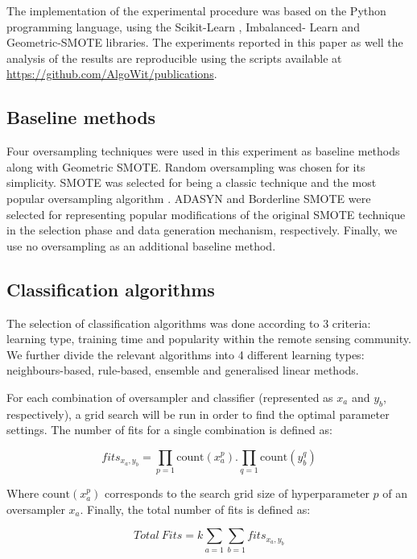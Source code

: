 \documentclass[parskip=full]{scrartcl}
\begin{document}
The implementation of the experimental procedure was based on the Python
programming language, using the Scikit-Learn \cite{Pedregosa2011}, Imbalanced-
Learn \cite{JMLR:v18:16-365} and Geometric-SMOTE \cite{Douzas2019} libraries.
The experiments reported in this paper as well the analysis of the results are
reproducible using the scripts available at \url{https://github.com/AlgoWit/publications}.

\subsection{Baseline methods}

Four oversampling techniques were used in this experiment as baseline methods
along with Geometric SMOTE. Random oversampling was chosen for its simplicity.
SMOTE was selected for being a classic technique and the most popular
oversampling algorithm \cite{Douzas2019}. ADASYN \cite{HaiboHe2008} and
Borderline SMOTE \cite{Han2005} were selected for representing popular
modifications of the original SMOTE technique in the selection phase and data
generation mechanism, respectively. Finally, we use no oversampling as an
additional baseline method.

\subsection{Classification algorithms}

The selection of classification algorithms was done according to 3 criteria:
learning type, training time and popularity within the remote sensing
community. We further divide the relevant algorithms into 4 different learning
types: neighbours-based, rule-based, ensemble and generalised linear methods.

For each combination of oversampler and classifier (represented as $x_a$ and
$y_b$, respectively), a grid search will be run in order to find the optimal
parameter settings. The number of fits for a single combination  is defined as:

\[
fits_{x_a,y_b}=\prod\limits_{p=1} \textrm{count}(x_a^p).\prod\limits_{q=1}
\textrm{count}(y_b^q)
\]

Where $\textrm{count}(x_a^p)$ corresponds to the search grid size of
hyperparameter $p$ of an oversampler $x_a$. Finally, the total number of fits
is defined as:

\[
Total\ Fits=k\sum\limits_{a=1} \sum\limits_{b=1} fits_{x_a,y_b}
\]
\end{document}
